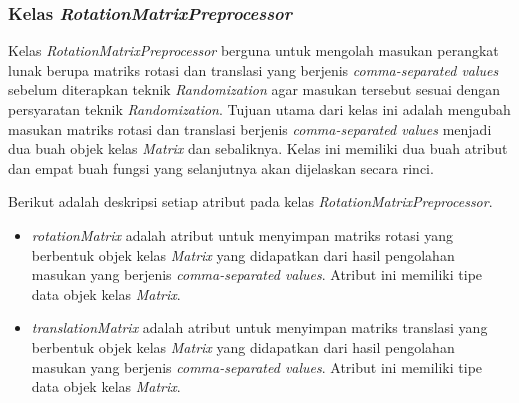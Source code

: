 \subsubsection{Kelas \textit{RotationMatrixPreprocessor}}
\label{subsubsec:kelas-rotationpre}

Kelas \textit{RotationMatrixPreprocessor} berguna untuk mengolah masukan perangkat lunak berupa matriks rotasi dan translasi yang berjenis \textit{comma-separated values} sebelum diterapkan teknik \textit{Randomization} agar masukan tersebut sesuai dengan persyaratan teknik \textit{Randomization}. Tujuan utama dari kelas ini adalah mengubah masukan matriks rotasi dan translasi berjenis \textit{comma-separated values} menjadi dua buah objek kelas \textit{Matrix} dan sebaliknya. Kelas ini memiliki dua buah atribut dan empat buah fungsi yang selanjutnya akan dijelaskan secara rinci.

Berikut adalah deskripsi setiap atribut pada kelas \textit{RotationMatrixPreprocessor}.
\begin{itemize}
	\item \textit{rotationMatrix} adalah atribut untuk menyimpan matriks rotasi yang berbentuk objek kelas \textit{Matrix} yang didapatkan dari hasil pengolahan masukan yang berjenis \textit{comma-separated values}. Atribut ini memiliki tipe data objek kelas \textit{Matrix}.
	\item \textit{translationMatrix} adalah atribut untuk menyimpan matriks translasi yang berbentuk objek kelas \textit{Matrix} yang didapatkan dari hasil pengolahan masukan yang berjenis \textit{comma-separated values}. Atribut ini memiliki tipe data objek kelas \textit{Matrix}.
\end{itemize}

